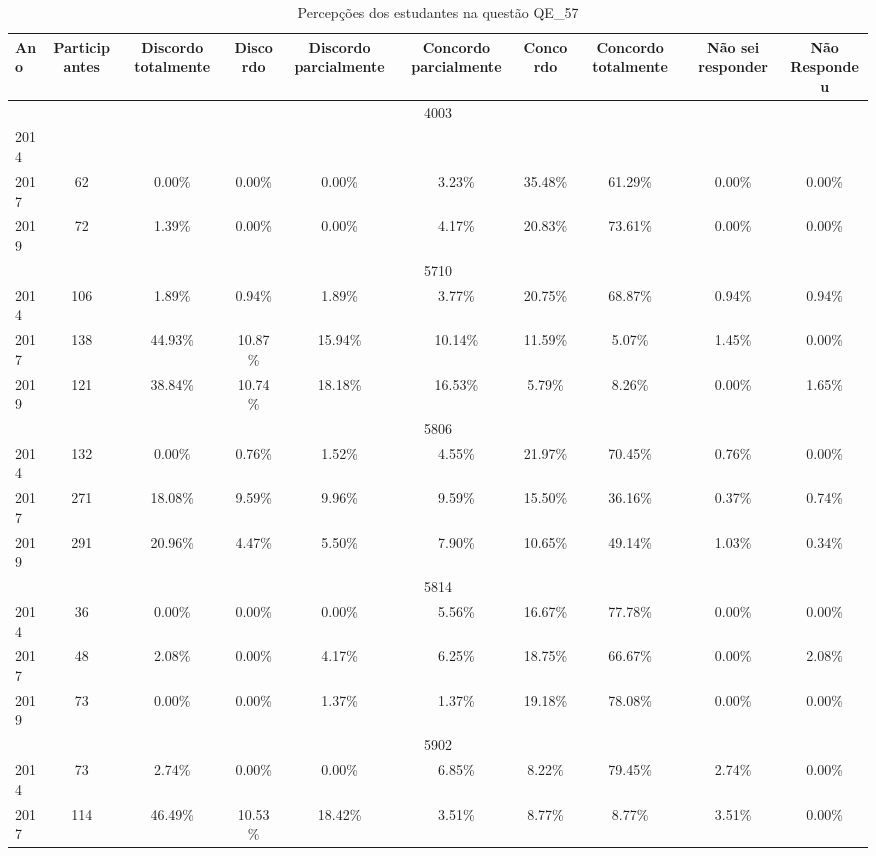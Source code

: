 \begin{table}[H]
\centering
\caption{Percepções dos estudantes na questão QE\_57}
\begin{tabular}{|l|c|ccc|ccc|cc|}
\hline
\toprule
Ano & Participantes & Discordo totalmente & Discordo & Discordo parcialmente & Concordo parcialmente & Concordo & Concordo totalmente & Não sei responder & Não Respondeu \\
\midrule
\hline
\multicolumn{10}{|c|}{4003}\\
\hline
2014 & & & & & & & & & \\
2017 & 62 & 0.00\% & 0.00\% & 0.00\% & 3.23\% & 35.48\% & 61.29\% & 0.00\% & 0.00\%\\
2019 & 72 & 1.39\% & 0.00\% & 0.00\% & 4.17\% & 20.83\% & 73.61\% & 0.00\% & 0.00\%\\
\hline
\hline
\multicolumn{10}{|c|}{5710}\\
\hline
2014 & 106 & 1.89\% & 0.94\% & 1.89\% & 3.77\% & 20.75\% & 68.87\% & 0.94\% & 0.94\%\\
2017 & 138 & 44.93\% & 10.87\% & 15.94\% & 10.14\% & 11.59\% & 5.07\% & 1.45\% & 0.00\%\\
2019 & 121 & 38.84\% & 10.74\% & 18.18\% & 16.53\% & 5.79\% & 8.26\% & 0.00\% & 1.65\%\\
\hline
\hline
\multicolumn{10}{|c|}{5806}\\
\hline
2014 & 132 & 0.00\% & 0.76\% & 1.52\% & 4.55\% & 21.97\% & 70.45\% & 0.76\% & 0.00\%\\
2017 & 271 & 18.08\% & 9.59\% & 9.96\% & 9.59\% & 15.50\% & 36.16\% & 0.37\% & 0.74\%\\
2019 & 291 & 20.96\% & 4.47\% & 5.50\% & 7.90\% & 10.65\% & 49.14\% & 1.03\% & 0.34\%\\
\hline
\hline
\multicolumn{10}{|c|}{5814}\\
\hline
2014 & 36 & 0.00\% & 0.00\% & 0.00\% & 5.56\% & 16.67\% & 77.78\% & 0.00\% & 0.00\%\\
2017 & 48 & 2.08\% & 0.00\% & 4.17\% & 6.25\% & 18.75\% & 66.67\% & 0.00\% & 2.08\%\\
2019 & 73 & 0.00\% & 0.00\% & 1.37\% & 1.37\% & 19.18\% & 78.08\% & 0.00\% & 0.00\%\\
\hline
\hline
\multicolumn{10}{|c|}{5902}\\
\hline
2014 & 73 & 2.74\% & 0.00\% & 0.00\% & 6.85\% & 8.22\% & 79.45\% & 2.74\% & 0.00\%\\
2017 & 114 & 46.49\% & 10.53\% & 18.42\% & 3.51\% & 8.77\% & 8.77\% & 3.51\% & 0.00\%\\

\end{tabular}
\end{table}
